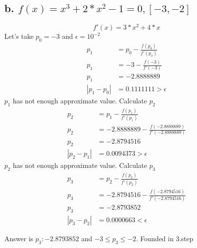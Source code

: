 \documentclass{article}
\begin{document}
\subsection{b. $f(x)=x^3+2*x^2-1 = 0, [-3, -2]$}
\begin{equation}
f'(x)=3*x^2+4*x
\end{equation}
Let's take $p_0=-3$ and $\epsilon=10^{-2}$
\begin{align}
\label{2.3.5.b.1}p_1 & = p_0 - \frac{f(p_0)}{f'(p_o)}\\
\label{2.3.5.b.2}p_1 & = -3 - \frac{f(-3)}{f'(-3)}\\
\label{2.3.5.b.3}p_1 & = -2.8888889\\
\label{2.3.5.b.4}|p_1-p_0| & =0.1111111 > \epsilon
\end{align}
$p_1$ has not enough approximate value. Calculate $p_2$
\begin{align}
\label{2.3.5.b.1}p_2 & = p_1 - \frac{f(p_1)}{f'(p_1)}\\
\label{2.3.5.b.2}p_2 & = -2.8888889 - \frac{f(-2.8888889)}{f'(-2.8888889)}\\
\label{2.3.5.b.3}p_2 & = -2.8794516\\
\label{2.3.5.b.4}|p_2-p_1| & =0.0094373 > \epsilon
\end{align}
$p_2$ has not enough approximate value. Calculate $p_3$
\begin{align}
\label{2.3.5.b.1}p_3 & = p_2 - \frac{f(p_2)}{f'(p_2)}\\
\label{2.3.5.b.2}p_3 & = -2.8794516 - \frac{f(-2.8794516)}{f'(-2.8794516)}\\
\label{2.3.5.b.3}p_3 & = -2.8793852\\
\label{2.3.5.b.4}|p_3-p_2| & =0.0000663 < \epsilon
\end{align}

Answer is $p_3:-2.8793852$ and $-3\leq p_3 \leq -2$. Founded in 3.step
\end{document}

